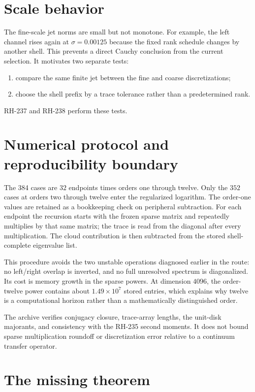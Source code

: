 \documentclass[11pt]{article}
\theoremstyle{remark}
\begin{document}
\section{Scale behavior}

The fine-scale jet norms are small but not monotone.  For example, the left
channel rises again at $\sigma=0.00125$ because the fixed rank schedule changes
by another shell.  This prevents a direct Cauchy conclusion from the current
selection.  It motivates two separate tests:
\begin{enumerate}[leftmargin=2em]
\item compare the same finite jet between the fine and coarse discretizations;
\item choose the shell prefix by a trace tolerance rather than a predetermined
rank.
\end{enumerate}
RH-237 and RH-238 perform these tests.

\section{Numerical protocol and reproducibility boundary}

The 384 cases are $32$ endpoints times orders one through twelve.  Only the
$352$ cases at orders two through twelve enter the regularized logarithm.
The order-one values are retained as a bookkeeping check on peripheral
subtraction.  For each endpoint the recursion starts with the frozen sparse
matrix and repeatedly multiplies by that same matrix; the trace is read from
the diagonal after every multiplication.  The cloud contribution is then
subtracted from the stored shell-complete eigenvalue list.

This procedure avoids the two unstable operations diagnosed earlier in the
route: no left/right overlap is inverted, and no full unresolved spectrum is
diagonalized.  Its cost is memory growth in the sparse powers.  At dimension
$4096$, the order-twelve power contains about $1.49\times10^7$ stored
entries, which explains why twelve is a computational horizon rather than a
mathematically distinguished order.

The archive verifies conjugacy closure, trace-array lengths, the unit-disk
majorants, and consistency with the RH-235 second moments.  It does not bound
sparse multiplication roundoff or discretization error relative to a
continuum transfer operator.

\section{The missing theorem}
\end{document}
